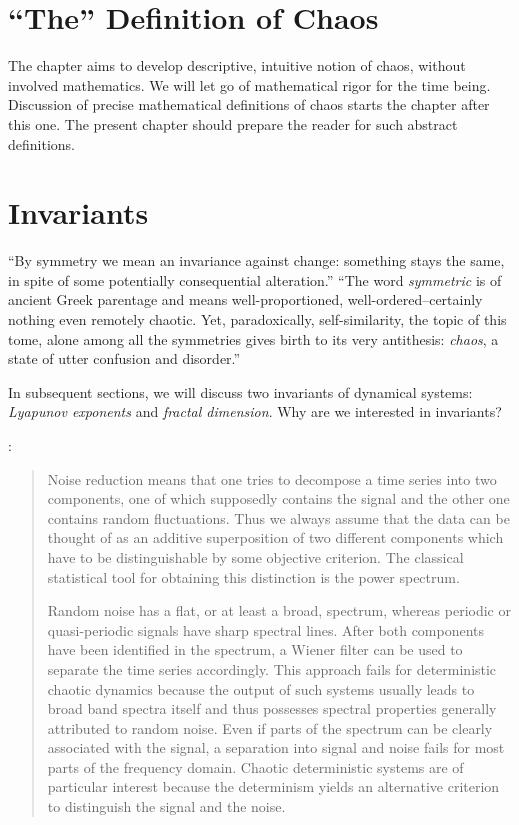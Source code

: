 \documentclass[12pt,twoside,draft]{book}
\begin{document}
\section{``The'' Definition of Chaos}
The chapter aims to develop descriptive, intuitive notion of chaos, without involved mathematics.
We will let go of mathematical rigor for the time being.
Discussion of precise mathematical definitions of chaos starts the chapter after this one.
The present chapter should prepare the reader for such abstract definitions.

\section{Invariants}
``By symmetry we mean an invariance against change: something stays the same, in spite of some potentially consequential alteration.''
%
``The word \textit{symmetric} is of ancient Greek parentage and means well-proportioned, well-ordered--certainly nothing even remotely chaotic.
Yet, paradoxically, self-similarity, the topic of this tome, alone among all the symmetries gives birth to its very antithesis: \textit{chaos}, a state of utter confusion and disorder.''
\cite[p.xiii-xv]{schroeder}

In subsequent sections, we will discuss two invariants of dynamical systems: \textit{Lyapunov exponents} and \textit{fractal dimension}.
Why are we interested in invariants?

\citet[p.51]{kantz-schreiber}:
\begin{quotation}
Noise reduction means that one tries to decompose a time series into two components, one of which supposedly contains the signal and the other one contains random fluctuations.
Thus we always assume that the data can be thought of as an additive superposition of two different components which have to be distinguishable by some objective criterion.
The classical statistical tool for obtaining this distinction is the power spectrum.

Random noise has a flat, or at least a broad, spectrum, whereas periodic or quasi-periodic signals have sharp spectral lines.
After both components have been identified in the spectrum, a Wiener filter can be used to separate the time series accordingly.
This approach fails for deterministic chaotic dynamics because the output of such systems usually leads to broad band spectra itself and thus possesses spectral properties generally attributed to random noise.
Even if parts of the spectrum can be clearly associated with the signal, a separation into signal and noise fails for most parts of the frequency domain. Chaotic deterministic systems are of particular interest because the determinism yields an alternative criterion to distinguish the signal and the noise. 
\end{quotation}
\end{document}
